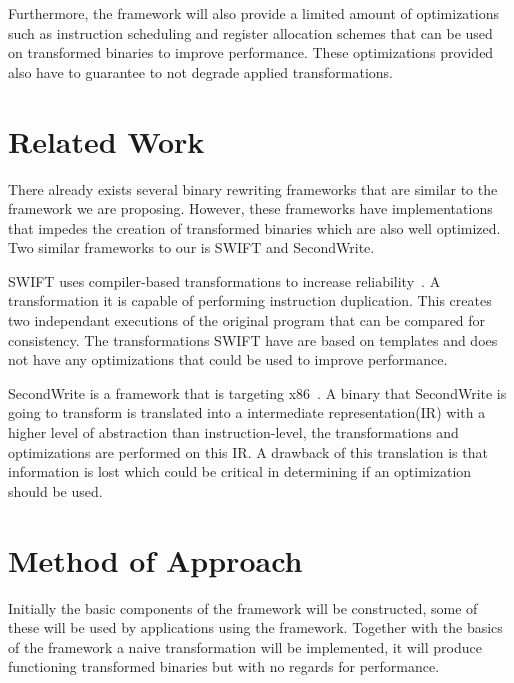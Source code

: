 Furthermore, the framework will also provide a limited amount of optimizations
such as instruction scheduling and register allocation schemes that can
be used on transformed binaries to improve performance. These optimizations
provided also have to guarantee to not degrade applied transformations.


\section{Related Work}
%
There already exists several binary rewriting frameworks that are similar
to the framework we are proposing. However, these frameworks have
implementations that impedes the creation of transformed binaries
which are also well optimized. Two similar frameworks to our is SWIFT and
SecondWrite.
%

SWIFT uses compiler-based transformations to increase reliability~\cite{swift}.
A transformation it is capable of performing instruction duplication. This
creates two independant executions of the original program that can be
compared for consistency.
%
The transformations SWIFT have are based on templates and does not
have any optimizations that could be used to improve performance.
%

SecondWrite is a framework that is targeting x86~\cite{secondwrite}.
A binary that SecondWrite is going to transform
is translated into a intermediate representation(IR) with a higher
level of abstraction than instruction-level, the transformations
and optimizations are performed on this IR.
%
A drawback of this translation is that information is lost
which could be critical in determining if an optimization
should be used.
%
%


\section{Method of Approach}

Initially the basic components of the framework will be
constructed, some of these will be used by applications
using the framework. Together with the basics of the framework
a naive transformation will be implemented, it will produce
functioning transformed binaries but with no regards for performance.
%

